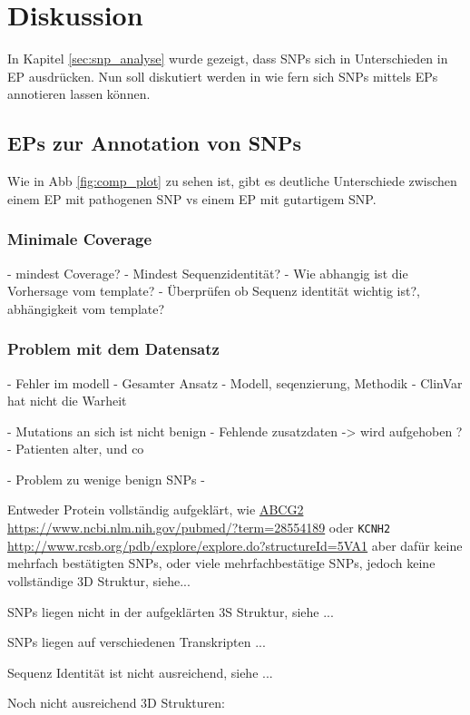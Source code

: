 \chapter{Diskussion}

In Kapitel \ref{sec:snp_analyse} wurde gezeigt, dass \ac{SNPs} sich in Unterschieden in \ac{EP} ausdrücken. Nun soll diskutiert werden in wie fern sich \ac{SNPs} mittels \ac{EPs} annotieren lassen können.

\section{EPs zur Annotation von SNPs}
\label{sec:snp_annotation}
Wie in \ac{Abb} \ref{fig:comp_plot} zu sehen ist, gibt es deutliche Unterschiede zwischen einem \ac{EP} mit pathogenen \ac{SNP} vs einem \ac{EP} mit gutartigem \ac{SNP}. 


\subsection{Minimale Coverage}
\label{sec:min_coverage}
- mindest Coverage?
- Mindest Sequenzidentität?
- Wie abhangig ist die Vorhersage vom template?
- Überprüfen ob Sequenz identität wichtig ist?, abhängigkeit vom template? 



\subsection{Problem mit dem Datensatz}
- Fehler im modell
- Gesamter Ansatz
- Modell, seqenzierung, Methodik
- ClinVar hat nicht die Warheit

- Mutations an sich ist nicht benign
- Fehlende zusatzdaten -> wird aufgehoben ?
- Patienten alter, und co

- Problem zu wenige benign SNPs
- 


Entweder Protein vollständig aufgeklärt, wie \url{ABCG2} \url{https://www.ncbi.nlm.nih.gov/pubmed/?term=28554189} oder \texttt{KCNH2} \url{http://www.rcsb.org/pdb/explore/explore.do?structureId=5VA1} aber dafür keine mehrfach bestätigten SNPs, oder viele mehrfachbestätige SNPs, jedoch keine vollständige 3D Struktur, siehe...

SNPs liegen nicht in der aufgeklärten 3S Struktur, siehe ...

SNPs liegen auf verschiedenen Transkripten ...

Sequenz Identität ist nicht ausreichend, siehe ...

Noch nicht ausreichend 3D Strukturen:

